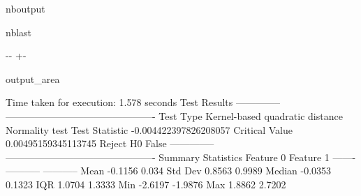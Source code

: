 \documentclass[letterpaper,10pt,english,openany,oneside]{sphinxmanual}
\begin{document}
\begin{sphinxuseclass}{nboutput}
\begin{sphinxuseclass}{nblast}
{

\kern-\sphinxverbatimsmallskipamount\kern-\baselineskip
\kern+\FrameHeightAdjust\kern-\fboxrule
\vspace{\nbsphinxcodecellspacing}

\begin{sphinxuseclass}{output_area}
\begin{sphinxuseclass}{}


\begin{sphinxVerbatim}[commandchars=\\\{\}]
Time taken for execution: 1.578 seconds
Test Results
--------------  ----------------------------------------------
Test Type       Kernel-based quadratic distance Normality test
Test Statistic  -0.004422397826208057
Critical Value  0.00495159345113745
Reject H0       False
--------------  ----------------------------------------------
Summary Statistics
           Feature 0    Feature 1
-------  -----------  -----------
Mean         -0.1156       0.034
Std Dev       0.8563       0.9989
Median       -0.0353       0.1323
IQR           1.0704       1.3333
Min          -2.6197      -1.9876
Max           1.8862       2.7202
\end{sphinxVerbatim}



\end{sphinxuseclass}
\end{sphinxuseclass}
}

\end{sphinxuseclass}
\end{sphinxuseclass}
\end{document}
